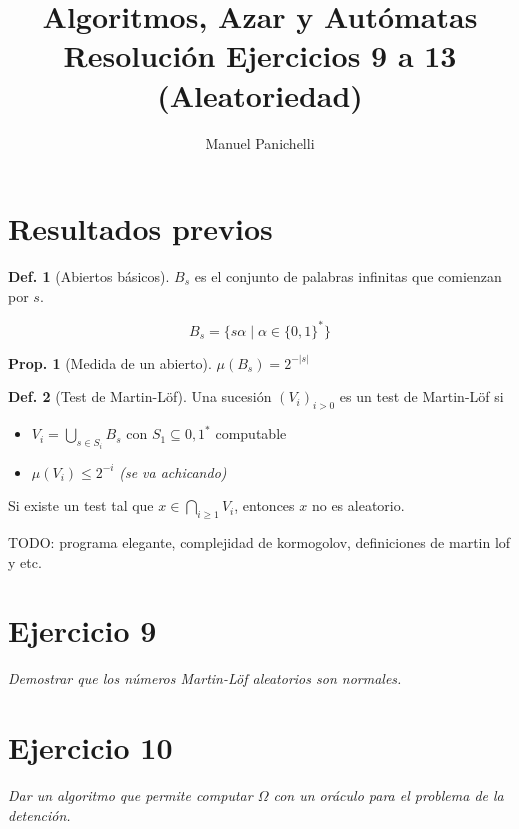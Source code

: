 \documentclass{article}
\author{Manuel Panichelli}
\title{Algoritmos, Azar y Autómatas\\Resolución Ejercicios 9 a 13 (Aleatoriedad)}
\theoremstyle{definition} %
\newtheorem{proposition}{Prop.}
\newtheorem{definition}{Def.}
\newcommand{\measure}[1]{\mu(#1)}
\newcommand{\sucML}{(V_i)_{i > 0}}
\begin{document}
\maketitle

\section*{Resultados previos}

\begin{definition}[Abiertos básicos]
    $B_s$ es el conjunto de palabras infinitas que comienzan por $s$.

    \[B_s = \{ s \alpha \mid \alpha \in \{0, 1\}^* \}\]

\begin{proposition}[Medida de un abierto]
    $\measure{B_s} = 2^{-|s|}$
\end{proposition}
\end{definition}

\begin{definition}[Test de Martin-Löf]
    Una sucesión $\sucML$ es un test de Martin-Löf si

    \begin{itemize}
        \item $V_i = \bigcup_{s \in S_i} B_s$ con $S_1 \subseteq {0, 1}^*$
        computable
        \item $\measure{V_i} \leq 2^{-i}$ \textit{(se va achicando)}
    \end{itemize}

    Si existe un test tal que $x \in \bigcap_{i \geq 1} V_i$, entonces $x$ no es
    aleatorio.
\end{definition}

TODO: programa elegante, complejidad de kormogolov, definiciones de martin lof y
etc.

\section*{Ejercicio 9}

\textit{Demostrar que los números Martin-Löf aleatorios son normales.}

\section*{Ejercicio 10}

\textit{Dar un algoritmo que permite computar $\Omega$ con un oráculo para el problema de la detención.}
\end{document}
